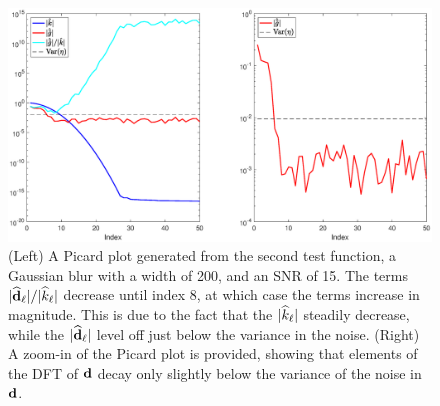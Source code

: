 \begin{figure}[htb]
	\centerline{\includegraphics[scale = 0.45]{Figures/PicardPlot1D_F2_S15_W200.eps}}
\caption{(Left) A Picard plot generated from the second test function, a Gaussian blur with a width of 200, and an SNR of 15. The terms $|\widehat{\mathbf{d}}_\ell|/|\widehat{k}_\ell|$ decrease until index 8, at which case the terms increase in magnitude. This is due to the fact that the $|\widehat{k}_\ell|$ steadily decrease, while the $|\widehat{\mathbf{d}}_\ell|$ level off just below the variance in the noise. (Right) A zoom-in of the Picard plot is provided, showing that elements of the DFT of $\mathbf{d}$ decay only slightly below the variance of the noise in $\mathbf{d}$.}
\label{PicardPlot}
\end{figure}

